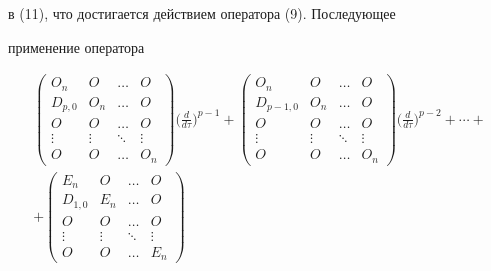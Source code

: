 \begin{pf}
в (11), что достигается действием оператора (9). Последующее


применение оператора


\begin{multline*}


\begin{pmatrix}


O_n & O & \dotsc & O\\


D_{p,0} & O_n & \dotsc & O\\


O & O & \dotsc & O\\


\vdots & \vdots & \ddots & \vdots\\


O & O & \dotsc & O_n 


\end{pmatrix}


\bigg(\frac{d}{d\tau}\bigg)^{p-1}+


\begin{pmatrix}


O_n & O & \dotsc & O\\


D_{p-1,0} & O_n & \dotsc & O\\


O & O & \dotsc & O\\


\vdots & \vdots & \ddots & \vdots\\


O & O & \dotsc & O_n 


\end{pmatrix}


\bigg(\frac{d}{d\tau}\bigg)^{p-2}


+ \dotsb + \\


%


+


\begin{pmatrix}


E_n & O & \dotsc & O\\


D_{1,0} & E_n & \dotsc & O\\


O & O & \dotsc & O\\


\vdots & \vdots & \ddots & \vdots\\


O & O & \dotsc & E_n 


\end{pmatrix}



\end{multline*}
\end{pf}
